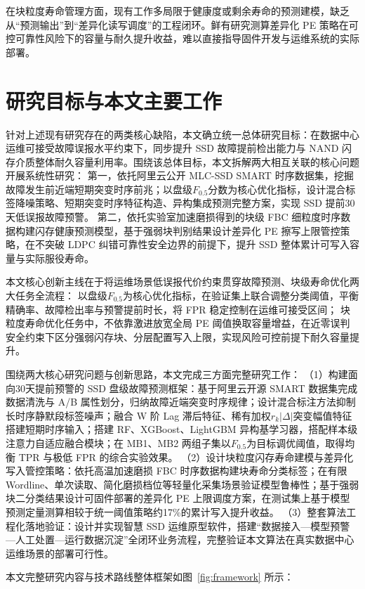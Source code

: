 在块粒度寿命管理方面，现有工作多局限于健康度或剩余寿命的预测建模，缺乏从“预测输出”到“差异化读写调度”的工程闭环。鲜有研究测算差异化 PE 策略在可控可靠性风险下的容量与耐久提升收益，难以直接指导固件开发与运维系统的实际部署。

\section{研究目标与本文主要工作}
针对上述现有研究存在的两类核心缺陷，本文确立统一总体研究目标：在数据中心运维可接受故障误报水平约束下，同步提升 SSD 故障提前检出能力与 NAND 闪存介质整体耐久容量利用率。围绕该总体目标，本文拆解两大相互关联的核心问题开展系统性研究：
第一，依托阿里云公开 MLC-SSD SMART 时序数据集，挖掘故障发生前近端短期突变时序前兆；以盘级$F_{0.5}$分数为核心优化指标，设计混合标签降噪策略、短期突变时序特征构造、异构集成预测完整方案，实现 SSD 提前30天低误报故障预警。
第二，依托实验室加速磨损得到的块级 FBC 细粒度时序数据构建闪存健康预测模型，基于强弱块判别结果设计差异化 PE 擦写上限管控策略，在不突破 LDPC 纠错可靠性安全边界的前提下，提升 SSD 整体累计可写入容量与实际服役寿命。

本文核心创新主线在于将运维场景低误报代价约束贯穿故障预测、块级寿命优化两大任务全流程：
以盘级$F_{0.5}$为核心优化指标，在验证集上联合调整分类阈值，平衡精确率、故障检出率与预警提前时长，将 FPR 稳定控制在运维可接受区间；
块粒度寿命优化任务中，不依靠激进放宽全局 PE 阈值换取容量增益，在近零误判安全约束下区分强弱闪存块、分层配置写入上限，实现风险可控前提下耐久容量提升。

围绕两大核心研究问题与创新思路，本文完成三方面完整研究工作：
（1）构建面向30天提前预警的 SSD 盘级故障预测框架：基于阿里云开源 SMART 数据集完成数据清洗与 A/B 属性划分，归纳故障近端突变时序规律；设计混合标注方法抑制长时序静默段标签噪声；融合 W 阶 Lag 滞后特征、稀有加权$r_k|\Delta|$突变幅值特征搭建短期时序输入；搭建 RF、XGBoost、LightGBM 异构基学习器，搭配样本级注意力自适应融合模块；在 MB1、MB2 两组子集以$F_{0.5}$为目标调优阈值，取得均衡 TPR 与极低 FPR 的综合实验效果。
（2）设计块粒度闪存寿命建模与差异化写入管控策略：依托高温加速磨损 FBC 时序数据构建块寿命分类标签；在有限 Wordline、单次读取、简化磨损档位等轻量化采集场景验证模型鲁棒性；基于强弱块二分类结果设计可固件部署的差异化 PE 上限调度方案，在测试集上基于模型预测定量测算相较于统一阈值策略约17\%的累计写入提升收益。
（3）整套算法工程化落地验证：设计并实现智慧 SSD 运维原型软件，搭建“数据接入—模型预警—人工处置—运行数据沉淀”全闭环业务流程，完整验证本文算法在真实数据中心运维场景的部署可行性。

本文完整研究内容与技术路线整体框架如图~\ref{fig:framework} 所示：

